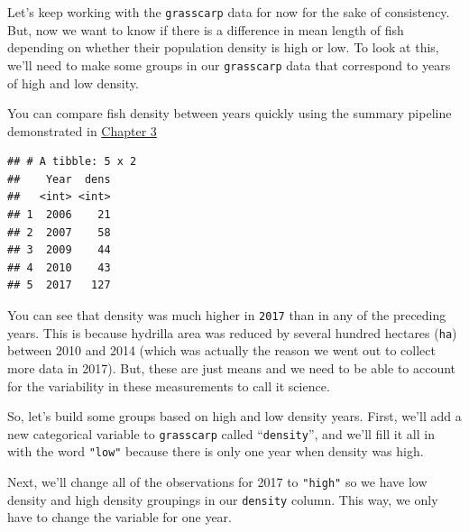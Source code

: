 \documentclass[
]{book}
\newenvironment{Shaded}{\begin{snugshade}}{\end{snugshade}}
\newcommand{\DataTypeTok}[1]{\textcolor[rgb]{0.13,0.29,0.53}{#1}}
\newcommand{\KeywordTok}[1]{\textcolor[rgb]{0.13,0.29,0.53}{\textbf{#1}}}
\newcommand{\NormalTok}[1]{#1}
\newcommand{\OperatorTok}[1]{\textcolor[rgb]{0.81,0.36,0.00}{\textbf{#1}}}
\newcommand{\StringTok}[1]{\textcolor[rgb]{0.31,0.60,0.02}{#1}}
\begin{document}
Let's keep working with the \texttt{grasscarp} data for now for the sake of consistency. But, now we want to know if there is a difference in mean length of fish depending on whether their population density is high or low. To look at this, we'll need to make some groups in our \texttt{grasscarp} data that correspond to years of high and low density.

You can compare fish density between years quickly using the summary pipeline demonstrated in \protect\hyperlink{Chapter3}{Chapter 3}

\begin{Shaded}
\end{Shaded}

\begin{verbatim}
## # A tibble: 5 x 2
##    Year  dens
##   <int> <int>
## 1  2006    21
## 2  2007    58
## 3  2009    44
## 4  2010    43
## 5  2017   127
\end{verbatim}

You can see that density was much higher in \texttt{2017} than in any of the preceding years. This is because hydrilla area was reduced by several hundred hectares (\texttt{ha}) between 2010 and 2014 (which was actually the reason we went out to collect more data in 2017). But, these are just means and we need to be able to account for the variability in these measurements to call it science.

So, let's build some groups based on high and low density years. First, we'll add a new categorical variable to \texttt{grasscarp} called ``\texttt{density}'', and we'll fill it all in with the word \texttt{"low"} because there is only one year when density was high.

\begin{Shaded}
\end{Shaded}

Next, we'll change all of the observations for 2017 to \texttt{"high"} so we have low density and high density groupings in our \texttt{density} column. This way, we only have to change the variable for one year.
\end{document}
